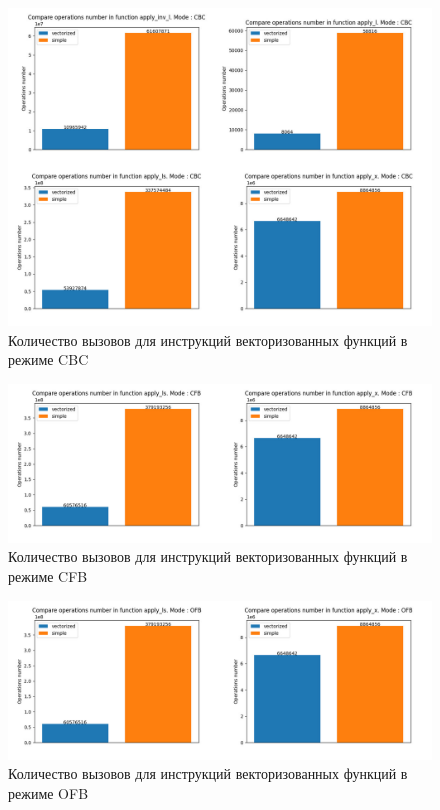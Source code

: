 \documentclass[a4paper, 12pt]{article}
\begin{document}
    \begin{figure}[h!]
        \centering
        \includegraphics[scale=0.5]{images/functions_instructions_calls_CBC.jpg}
        \caption{Количество вызовов для инструкций векторизованных функций в режиме CBC}
        \label{fig:functions_instructions_calls_CBC}
    \end{figure}

    \begin{figure}[h!]
        \centering
        \includegraphics[scale=0.5]{images/functions_instructions_calls_CFB.jpg}
        \caption{Количество вызовов для инструкций векторизованных функций в режиме CFB}
        \label{fig:functions_instructions_calls_CFB}
    \end{figure}

    \begin{figure}[h!]
        \centering
        \includegraphics[scale=0.5]{images/functions_instructions_calls_OFB.jpg}
        \caption{Количество вызовов для инструкций векторизованных функций в режиме OFB}
        \label{fig:functions_instructions_calls_OFB}
    \end{figure}
\end{document}

